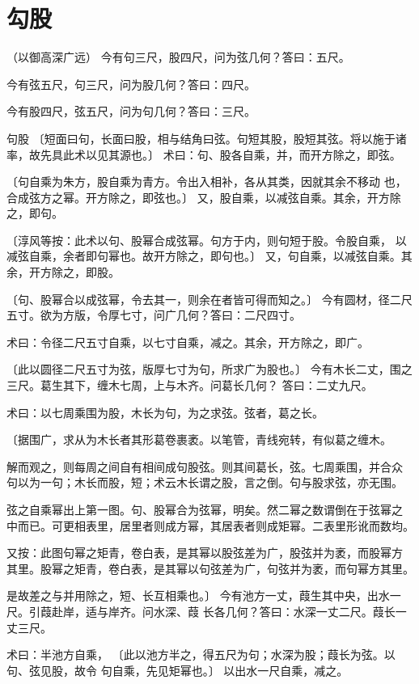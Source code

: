 \documentclass[a4paper,12pt,UTF8,twoside]{ctexbook}
\begin{document}
\chapter{勾股}
（以御高深广远） 今有句三尺，股四尺，问为弦几何？答曰：五尺。

今有弦五尺，句三尺，问为股几何？答曰：四尺。

今有股四尺，弦五尺，问为句几何？答曰：三尺。

句股 〔短面曰句，长面曰股，相与结角曰弦。句短其股，股短其弦。将以施于诸 率，故先具此术以见其源也。〕 术曰：句、股各自乘，并，而开方除之，即弦。

〔句自乘为朱方，股自乘为青方。令出入相补，各从其类，因就其余不移动 也，合成弦方之幂。开方除之，即弦也。〕 又，股自乘，以减弦自乘。其余，开方除之，即句。

〔淳风等按：此术以句、股幂合成弦幂。句方于内，则句短于股。令股自乘， 以减弦自乘，余者即句幂也。故开方除之，即句也。〕 又，句自乘，以减弦自乘。其余，开方除之，即股。

〔句、股幂合以成弦幂，令去其一，则余在者皆可得而知之。〕 今有圆材，径二尺五寸。欲为方版，令厚七寸，问广几何？答曰：二尺四寸。

术曰：令径二尺五寸自乘，以七寸自乘，减之。其余，开方除之，即广。

〔此以圆径二尺五寸为弦，版厚七寸为句，所求广为股也。〕 今有木长二丈，围之三尺。葛生其下，缠木七周，上与木齐。问葛长几何？ 答曰：二丈九尺。

术曰：以七周乘围为股，木长为句，为之求弦。弦者，葛之长。

〔据围广，求从为木长者其形葛卷裹袤。以笔管，青线宛转，有似葛之缠木。

解而观之，则每周之间自有相间成句股弦。则其间葛长，弦。七周乘围，并合众 句以为一句；木长而股，短；术云木长谓之股，言之倒。句与股求弦，亦无围。

弦之自乘幂出上第一图。句、股幂合为弦幂，明矣。然二幂之数谓倒在于弦幂之 中而已。可更相表里，居里者则成方幂，其居表者则成矩幂。二表里形讹而数均。

又按：此图句幂之矩青，卷白表，是其幂以股弦差为广，股弦并为袤，而股幂方 其里。股幂之矩青，卷白表，是其幂以句弦差为广，句弦并为袤，而句幂方其里。

是故差之与并用除之，短、长互相乘也。〕 今有池方一丈，葭生其中央，出水一尺。引葭赴岸，适与岸齐。问水深、葭 长各几何？答曰：水深一丈二尺。葭长一丈三尺。

术曰：半池方自乘， 〔此以池方半之，得五尺为句；水深为股；葭长为弦。以句、弦见股，故令 句自乘，先见矩幂也。〕 以出水一尺自乘，减之。
\end{document}
